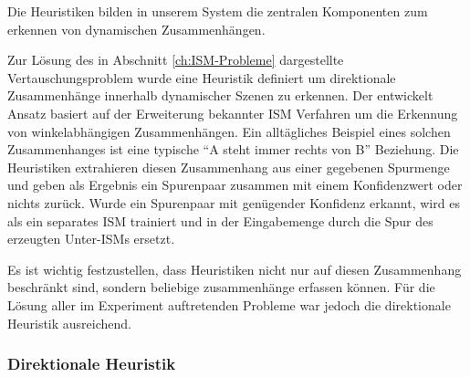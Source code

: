 Die Heuristiken bilden in unserem System die zentralen Komponenten zum erkennen von dynamischen Zusammenhängen.

Zur Lösung des in Abschnitt \vref{ch:ISM-Probleme} dargestellte Vertauschungsproblem wurde eine Heuristik definiert um direktionale Zusammenhänge innerhalb dynamischer Szenen zu erkennen.
Der entwickelt Ansatz basiert auf der Erweiterung bekannter ISM Verfahren um die Erkennung von winkelabhängigen Zusammenhängen.
Ein alltägliches Beispiel eines solchen Zusammenhanges ist eine typische "`A steht immer rechts von B"' Beziehung.
Die Heuristiken extrahieren diesen Zusammenhang aus einer gegebenen Spurmenge und geben als Ergebnis ein Spurenpaar zusammen mit einem Konfidenzwert oder nichts zurück.
Wurde ein Spurenpaar mit genügender Konfidenz erkannt, wird es als ein separates ISM trainiert und in der Eingabemenge durch die Spur des erzeugten Unter-ISMs ersetzt.

Es ist wichtig festzustellen, dass Heuristiken nicht nur auf diesen Zusammenhang beschränkt sind, sondern beliebige zusammenhänge erfassen können.
Für die Lösung aller im Experiment auftretenden Probleme war jedoch die direktionale Heuristik ausreichend.

\subsubsection{Direktionale Heuristik}\label{ch:heuristik}

